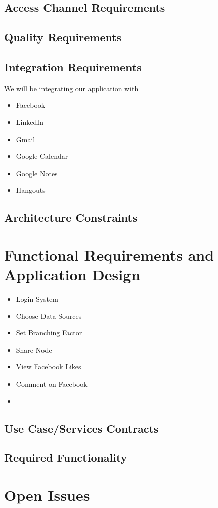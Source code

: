 \documentclass[a4paper]{article}
\begin{document}
	\subsection{Access Channel Requirements}

	\subsection{Quality Requirements}
	
	
	\subsection{Integration Requirements}
	We will be integrating our application with
	\begin{itemize}
	    \item Facebook
	    \item LinkedIn
	    \item Gmail
	    \item Google Calendar
	    \item Google Notes
	    \item Hangouts
	\end{itemize}
	
	\subsection{Architecture Constraints}

	\pagebreak
	\section{Functional Requirements and Application Design}

    \begin{itemize}
        \item Login System
        \item Choose Data Sources
        \item Set Branching Factor
        \item Share Node
        \item View Facebook Likes
        \item Comment on Facebook
        \item
    \end{itemize}
    
	
	\subsection{Use Case/Services Contracts}


  
	
    \pagebreak

	
	\subsection{Required Functionality}

	\pagebreak
	\section{Open Issues}
	
		
\end{document}
